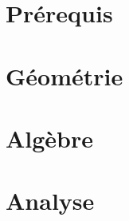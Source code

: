 \documentclass[11pt,french]{article}
\theoremstyle{definition}
\theoremstyle{plain}
\theoremstyle{remark}
\begin{document}
\vspace{\baselineskip}

\vfill

\date{}

\newpage

\tableofcontents
\vspace{5cm}

\vfill \hfill
\newpage \setcounter{page}{1}

\part{Prérequis}







\part{Géométrie}







\part{Algèbre}











\part{Analyse}










\end{document}
